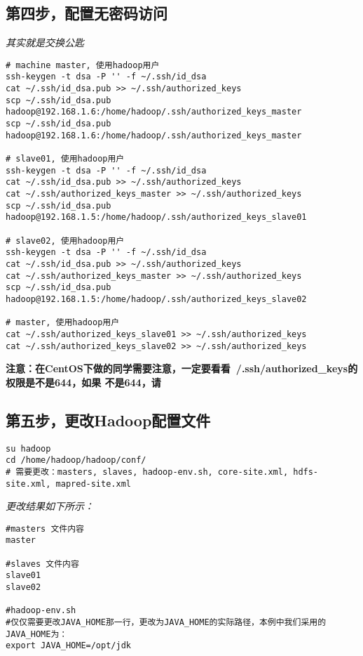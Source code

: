 \documentclass{article}
\begin{document}
\subsection{第四步，配置无密码访问}
\textit{其实就是交换公匙}
\begin{verbatim}
# machine master, 使用hadoop用户
ssh-keygen -t dsa -P '' -f ~/.ssh/id_dsa
cat ~/.ssh/id_dsa.pub >> ~/.ssh/authorized_keys
scp ~/.ssh/id_dsa.pub hadoop@192.168.1.6:/home/hadoop/.ssh/authorized_keys_master
scp ~/.ssh/id_dsa.pub hadoop@192.168.1.6:/home/hadoop/.ssh/authorized_keys_master

# slave01, 使用hadoop用户
ssh-keygen -t dsa -P '' -f ~/.ssh/id_dsa
cat ~/.ssh/id_dsa.pub >> ~/.ssh/authorized_keys
cat ~/.ssh/authorized_keys_master >> ~/.ssh/authorized_keys
scp ~/.ssh/id_dsa.pub hadoop@192.168.1.5:/home/hadoop/.ssh/authorized_keys_slave01

# slave02, 使用hadoop用户
ssh-keygen -t dsa -P '' -f ~/.ssh/id_dsa
cat ~/.ssh/id_dsa.pub >> ~/.ssh/authorized_keys
cat ~/.ssh/authorized_keys_master >> ~/.ssh/authorized_keys
scp ~/.ssh/id_dsa.pub hadoop@192.168.1.5:/home/hadoop/.ssh/authorized_keys_slave02

# master, 使用hadoop用户
cat ~/.ssh/authorized_keys_slave01 >> ~/.ssh/authorized_keys
cat ~/.ssh/authorized_keys_slave02 >> ~/.ssh/authorized_keys
\end{verbatim}

\textbf{注意：在CentOS下做的同学需要注意，一定要看看~/.ssh/authorized\_keys的权限是不是644，如果
不是644，请}

\subsection{第五步，更改Hadoop配置文件}
\begin{verbatim}
su hadoop
cd /home/hadoop/hadoop/conf/
# 需要更改：masters, slaves, hadoop-env.sh, core-site.xml, hdfs-site.xml, mapred-site.xml
\end{verbatim}

\textit{更改结果如下所示：}

\begin{verbatim}
#masters 文件内容
master

#slaves 文件内容
slave01
slave02

#hadoop-env.sh
#仅仅需要更改JAVA_HOME那一行，更改为JAVA_HOME的实际路径，本例中我们采用的JAVA_HOME为：
export JAVA_HOME=/opt/jdk
\end{verbatim}
\end{document}
